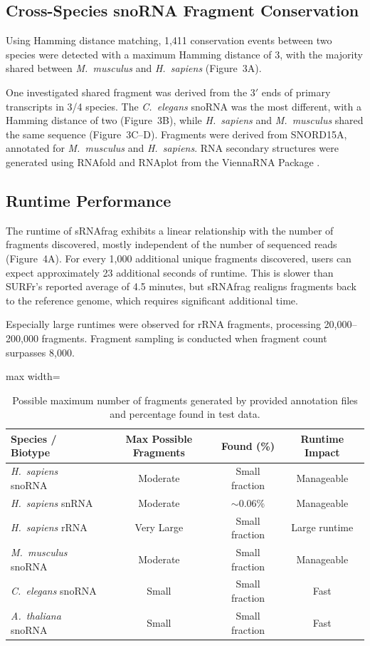 \documentclass{article}
\begin{document}
\subsection{Cross-Species snoRNA Fragment Conservation}

Using Hamming distance matching, 1,411 conservation events between two species were detected with a maximum Hamming distance of 3, with the majority shared between \textit{M.~musculus} and \textit{H.~sapiens} (Figure~3A).

One investigated shared fragment was derived from the 3$'$ ends of primary transcripts in 3/4 species. The \textit{C.~elegans} snoRNA was the most different, with a Hamming distance of two (Figure~3B), while \textit{H.~sapiens} and \textit{M.~musculus} shared the same sequence (Figure~3C--D). Fragments were derived from SNORD15A, annotated for \textit{M.~musculus} and \textit{H.~sapiens}. RNA secondary structures were generated using RNAfold and RNAplot from the ViennaRNA Package \citep{lorenz2011viennarna}.

\subsection{Runtime Performance}

The runtime of sRNAfrag exhibits a linear relationship with the number of fragments discovered, mostly independent of the number of sequenced reads (Figure~4A). For every 1,000 additional unique fragments discovered, users can expect approximately 23 additional seconds of runtime. This is slower than SURFr's reported average of 4.5 minutes, but sRNAfrag realigns fragments back to the reference genome, which requires significant additional time.

Especially large runtimes were observed for rRNA fragments, processing 20,000--200,000 fragments. Fragment sampling is conducted when fragment count surpasses 8,000.

\begin{table}[htbp]
\centering
\caption{Possible maximum number of fragments generated by provided annotation files and percentage found in test data.}
\label{tab:fragments}
\begin{adjustbox}{max width=\textwidth}
\begin{tabular}{lccc}
\toprule
Species / Biotype & Max Possible Fragments & Found (\%) & Runtime Impact \\
\midrule
\textit{H.~sapiens} snoRNA & Moderate & Small fraction & Manageable \\
\textit{H.~sapiens} snRNA & Moderate & $\sim$0.06\% & Manageable \\
\textit{H.~sapiens} rRNA & Very Large & Small fraction & Large runtime \\
\textit{M.~musculus} snoRNA & Moderate & Small fraction & Manageable \\
\textit{C.~elegans} snoRNA & Small & Small fraction & Fast \\
\textit{A.~thaliana} snoRNA & Small & Small fraction & Fast \\
\bottomrule
\end{tabular}
\end{adjustbox}
\end{table}
\end{document}
